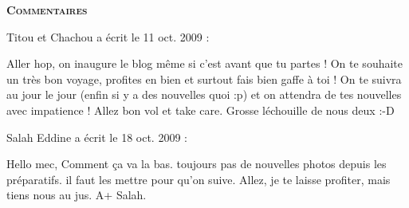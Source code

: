 \bigskip
\textbf{\textsc{Commentaires}}

\medskip
Titou et Chachou a écrit le 11 oct. 2009 :
\begin{displayquote}
Aller hop, on inaugure le blog même si c'est avant que tu partes !
On te souhaite un très bon voyage, profites en bien et surtout fais bien gaffe à toi !
On te suivra au jour le jour (enfin si y a des nouvelles quoi :p) et on attendra de tes nouvelles avec impatience !
Allez bon vol et take care.
Grosse léchouille de nous deux :-D
\end{displayquote}

\medskip
Salah Eddine a écrit le 18 oct. 2009 :
\begin{displayquote}
Hello mec,
Comment ça va la bas. toujours pas de nouvelles photos depuis les préparatifs. il faut les mettre pour qu'on suive.
Allez, je te laisse profiter, mais tiens nous au jus.
A+
Salah.
\end{displayquote}

